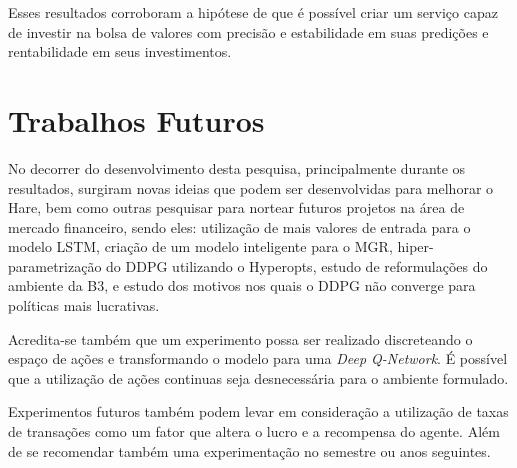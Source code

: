 Esses resultados corroboram a hipótese de que é possível criar um serviço capaz de investir na bolsa de valores com precisão e estabilidade em suas predições e rentabilidade em seus investimentos.


\section{Trabalhos Futuros}


No decorrer do desenvolvimento desta pesquisa, principalmente durante os resultados, surgiram novas ideias que podem ser desenvolvidas para melhorar o Hare, bem como outras pesquisar para nortear futuros projetos na área de mercado financeiro, sendo eles: utilização de mais valores de entrada para o modelo \acrshort{LSTM}, criação de um modelo inteligente para o \acrshort{MGR}, hiper-parametrização do \acrshort{DDPG} utilizando o Hyperopts, estudo de reformulações do ambiente da B3, e estudo dos motivos nos quais o \acrshort{DDPG} não converge para políticas mais lucrativas. 

Acredita-se também que um experimento possa ser realizado discreteando o espaço de ações e transformando o modelo para uma \emph{Deep Q-Network}. É possível que a utilização de ações continuas seja desnecessária para o ambiente formulado. 

Experimentos futuros também podem levar em consideração a utilização de taxas de transações como um fator que altera o lucro e a recompensa do agente. Além de se recomendar também uma experimentação no semestre ou anos seguintes.

